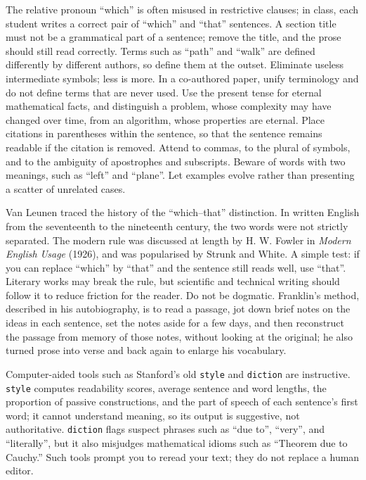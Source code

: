 \documentclass[11pt]{article}
\begin{document}
The relative pronoun ``which'' is often misused in restrictive clauses; in class, each student writes a correct pair of ``which'' and ``that'' sentences. A section title must not be a grammatical part of a sentence; remove the title, and the prose should still read correctly. Terms such as ``path'' and ``walk'' are defined differently by different authors, so define them at the outset. Eliminate useless intermediate symbols; less is more. In a co-authored paper, unify terminology and do not define terms that are never used. Use the present tense for eternal mathematical facts, and distinguish a problem, whose complexity may have changed over time, from an algorithm, whose properties are eternal. Place citations in parentheses within the sentence, so that the sentence remains readable if the citation is removed. Attend to commas, to the plural of symbols, and to the ambiguity of apostrophes and subscripts. Beware of words with two meanings, such as ``left'' and ``plane''. Let examples evolve rather than presenting a scatter of unrelated cases.

Van Leunen traced the history of the ``which--that'' distinction. In written English from the seventeenth to the nineteenth century, the two words were not strictly separated. The modern rule was discussed at length by H. W. Fowler in \emph{Modern English Usage} (1926), and was popularised by Strunk and White. A simple test: if you can replace ``which'' by ``that'' and the sentence still reads well, use ``that''. Literary works may break the rule, but scientific and technical writing should follow it to reduce friction for the reader. Do not be dogmatic. Franklin's method, described in his autobiography, is to read a passage, jot down brief notes on the ideas in each sentence, set the notes aside for a few days, and then reconstruct the passage from memory of those notes, without looking at the original; he also turned prose into verse and back again to enlarge his vocabulary.

Computer-aided tools such as Stanford's old \texttt{style} and \texttt{diction} are instructive. \texttt{style} computes readability scores, average sentence and word lengths, the proportion of passive constructions, and the part of speech of each sentence's first word; it cannot understand meaning, so its output is suggestive, not authoritative. \texttt{diction} flags suspect phrases such as ``due to'', ``very'', and ``literally'', but it also misjudges mathematical idioms such as ``Theorem due to Cauchy.'' Such tools prompt you to reread your text; they do not replace a human editor.
\end{document}
